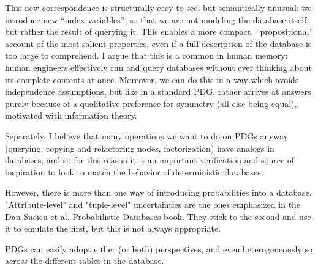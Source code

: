 \documentclass{article}
\theoremstyle{plain}
\theoremstyle{definition}
\theoremstyle{remark}
\begin{document}
This new correspondence is structurally easy to see, but semantically unusual: we introduce new ``index variables'', so that we are not modeling the database itself, but rather the result of querying it. This enables a more compact, ``propositional'' account of the most salient properties, even if a full description of the database is too large to comprehend. I argue that this is a common in human memory: human engineers effectively run and query databases without ever thinking about its complete contents at once. Moreover, we can do this in a way which avoids independence assumptions, but like in a standard PDG, rather arrives at answers purely because of a qualitative preference for symmetry (all else being equal), motivated with information theory.

Separately, I believe that many operations we want to do on PDGs anyway (querying, copying and refactoring nodes, factorization) have analogs in databases, and so for this reason it is an important verification and source of inspiration to look to match the behavior of deterministic databases.

However, there is more than one way of introducing probabilities into a database. "Attribute-level" and "tuple-level" uncertainties are the ones emphasized in the Dan Sucieu et al. Probabilistic Databases book. They stick to the second and use it to emulate the first, but this is not always appropriate.


PDGs can easily adopt either (or both) perspectives, and even heterogeneously so across the different tables in the database. 
\end{document}
